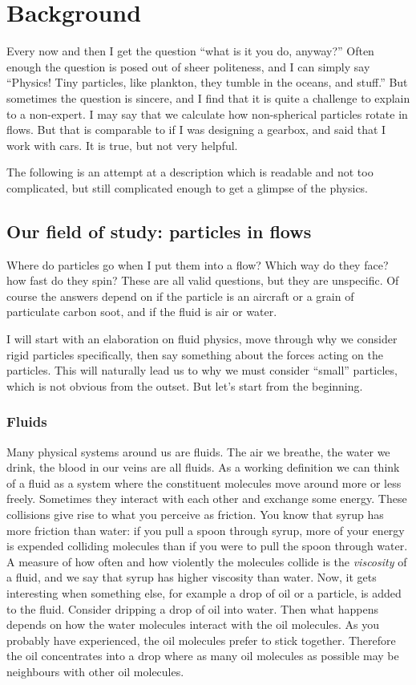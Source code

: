\documentclass[thesis.tex]{subfiles}
\begin{document}
\chapter{Background}\label{sec:background}

 Every now and then I get the question ``what is it you do, anyway?'' Often enough the question is posed out of sheer politeness, and I can simply say ``Physics! Tiny particles, like plankton, they tumble in the oceans, and stuff.'' But sometimes the question is sincere, and I find that it is quite a challenge to explain to a non-expert. I may say that we calculate how non-spherical particles rotate in flows. But that is comparable to if I was designing a gearbox, and said that I work with cars. It is true, but not very helpful. 

 The following is an attempt at a description which is readable and not too complicated, but still complicated enough to get a glimpse of the physics. 


\section{Our field of study: particles in flows}\label{sec:context}

Where do particles go when I put them into a flow? Which way do they face? how fast do they spin? These are all valid questions, but they are unspecific. Of course the answers depend on if the particle is an aircraft or a grain of particulate carbon soot, and if the fluid is air or water. 

I will start with an elaboration on fluid physics, move through why we consider rigid particles specifically, then say something about the forces acting on the particles. This will naturally lead us to why we must consider ``small'' particles, which is not obvious from the outset. But let's start from the beginning.

\subsection*{Fluids}

Many physical systems around us are fluids. The air we breathe, the water we drink, the blood in our veins are all fluids. As a working definition we can think of a fluid as a system where the constituent molecules move around more or less freely. Sometimes they interact with each other and exchange some energy. These collisions give rise to what you perceive as friction. You know that syrup has more friction than water: if you pull a spoon through syrup, more of your energy is expended colliding molecules than if you were to pull the spoon through water. A measure of how often and how violently the molecules collide is the \emph{viscosity} of a fluid, and we say that syrup has higher viscosity than water. Now, it gets interesting when something else, for example a drop of oil or a particle, is added to the fluid. Consider dripping a drop of oil into water. Then what happens depends on how the water molecules interact with the oil molecules. As you probably have experienced, the oil molecules prefer to stick together. Therefore the oil concentrates into a drop where as many oil molecules as possible may be neighbours with other oil molecules.
\end{document}
